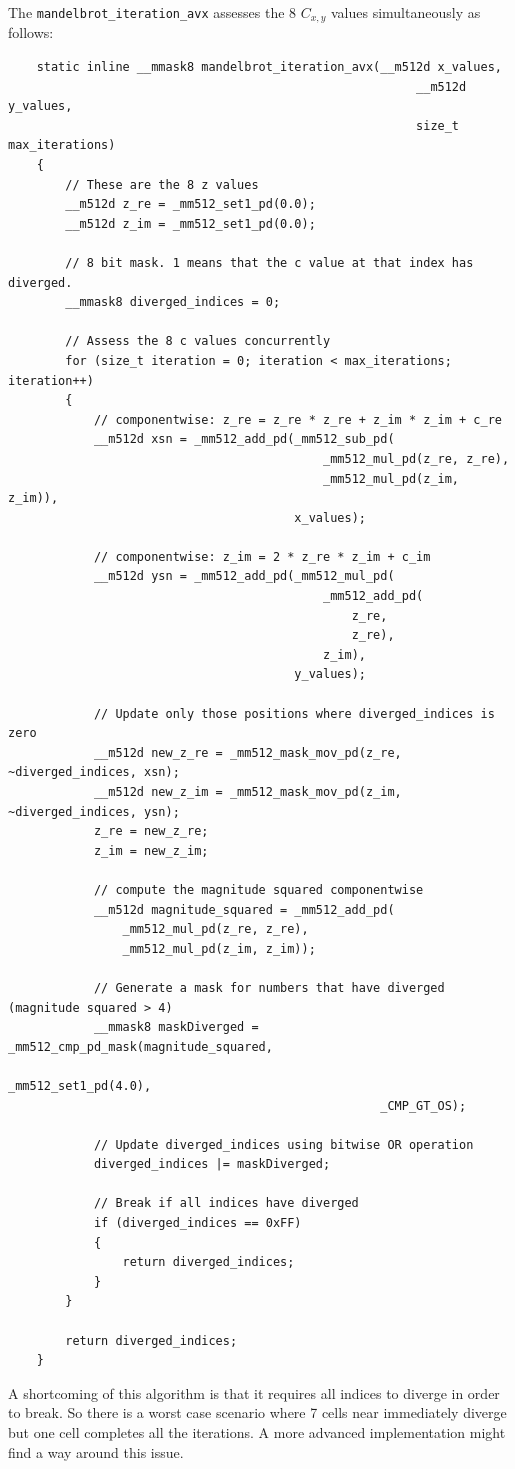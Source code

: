 \documentclass{article}
\begin{document}
\newpage
\noindent The \texttt{mandelbrot\_iteration\_avx} assesses the 8 $C_{x,y}$ values simultaneously as follows:
\begin{lstlisting}
    static inline __mmask8 mandelbrot_iteration_avx(__m512d x_values,
                                                         __m512d y_values,
                                                         size_t max_iterations)
    {
        // These are the 8 z values
        __m512d z_re = _mm512_set1_pd(0.0);
        __m512d z_im = _mm512_set1_pd(0.0);

        // 8 bit mask. 1 means that the c value at that index has diverged.
        __mmask8 diverged_indices = 0;

        // Assess the 8 c values concurrently
        for (size_t iteration = 0; iteration < max_iterations; iteration++)
        {
            // componentwise: z_re = z_re * z_re + z_im * z_im + c_re
            __m512d xsn = _mm512_add_pd(_mm512_sub_pd(
                                            _mm512_mul_pd(z_re, z_re),
                                            _mm512_mul_pd(z_im, z_im)),
                                        x_values);

            // componentwise: z_im = 2 * z_re * z_im + c_im
            __m512d ysn = _mm512_add_pd(_mm512_mul_pd(
                                            _mm512_add_pd(
                                                z_re,
                                                z_re),
                                            z_im),
                                        y_values);

            // Update only those positions where diverged_indices is zero
            __m512d new_z_re = _mm512_mask_mov_pd(z_re, ~diverged_indices, xsn);
            __m512d new_z_im = _mm512_mask_mov_pd(z_im, ~diverged_indices, ysn);
            z_re = new_z_re;
            z_im = new_z_im;

            // compute the magnitude squared componentwise
            __m512d magnitude_squared = _mm512_add_pd(
                _mm512_mul_pd(z_re, z_re),
                _mm512_mul_pd(z_im, z_im));

            // Generate a mask for numbers that have diverged (magnitude squared > 4)
            __mmask8 maskDiverged = _mm512_cmp_pd_mask(magnitude_squared,
                                                    _mm512_set1_pd(4.0),
                                                    _CMP_GT_OS);

            // Update diverged_indices using bitwise OR operation
            diverged_indices |= maskDiverged;

            // Break if all indices have diverged
            if (diverged_indices == 0xFF)
            {
                return diverged_indices;
            }
        }

        return diverged_indices;
    }
\end{lstlisting}
\noindent A shortcoming of this algorithm is that it requires all indices to diverge 
in order to break. So there is a worst case scenario where 7 cells near immediately 
diverge but one cell completes all the iterations. A more advanced implementation might 
find a way around this issue.
\end{document}
